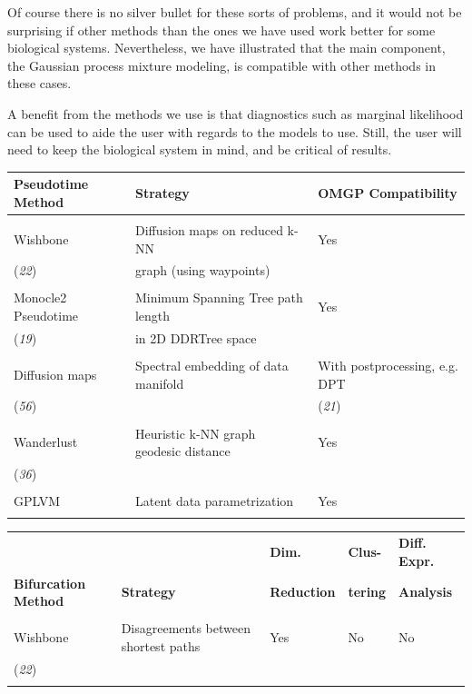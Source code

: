 Of course there is no silver bullet for these sorts of problems, and it would not be surprising if other methods than the ones we have used work better for some biological systems. Nevertheless, we have illustrated that the main component, the Gaussian process mixture modeling, is compatible with other methods in these cases.

A benefit from the methods we use is that diagnostics such as marginal likelihood can be used to aide the user with regards to the models to use. Still, the user will need to keep the biological system in mind, and be critical of results.

\begin{table}
\centering
\begin{tabularx}{0.95\textwidth}{lll}
\textbf{Pseudotime Method} & \textbf{Strategy} & \textbf{OMGP Compatibility} \\
\hline \\ 
Wishbone & Diffusion maps on reduced k-NN & Yes \\
({\it 22}) & graph (using waypoints) & \\ & & \\
Monocle2 Pseudotime &  Minimum Spanning Tree path length & Yes \\
({\it 19}) & in 2D DDRTree space &  \\ & &  \\
Diffusion maps & Spectral embedding of data manifold & With postprocessing, e.g. DPT \\
({\it 56}) & & ({\it 21}) \\ & & \\
Wanderlust & Heuristic k-NN graph geodesic distance & Yes \\
({\it 36}) & & \\ & & \\
GPLVM & Latent data parametrization & Yes  \\ & & \\
\end{tabularx}
\begin{tabularx}{0.95\textwidth}{lllll}
 &  & \textbf{Dim. } & \textbf{Clus-} & \textbf{Diff. Expr.} \\
\textbf{Bifurcation Method} & \textbf{Strategy} & \textbf{Reduction} & \textbf{tering} & \textbf{Analysis} \\
\hline \\
Wishbone & Disagreements between shortest paths & Yes & No & No \\
({\it 22}) & & & & \\ & & & &\\

\end{tabularx}
\end{table}
